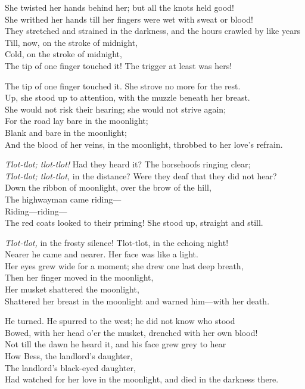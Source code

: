 \documentclass[oneside,12pt,english]{book}
\begin{document}
She twisted her hands behind her; but all the knots held good!\\
She writhed her hands till her fingers were wet with sweat or blood!\\
They stretched and strained in the darkness, and the hours crawled by like
years\\
Till, now, on the stroke of midnight,\\
Cold, on the stroke of midnight,\\
The tip of one finger touched it! The trigger at least was hers!


The tip of one finger touched it. She strove no more for the rest.\\
Up, she stood up to attention, with the muzzle beneath her breast.\\
She would not risk their hearing; she would not strive again;\\
For the road lay bare in the moonlight;\\
Blank and bare in the moonlight;\\
And the blood of her veins, in the moonlight, throbbed to her love’s refrain.


\textit{Tlot-tlot; tlot-tlot!} Had they heard it? The horsehoofs ringing
clear;\\
\textit{Tlot-tlot; tlot-tlot,} in the distance? Were they deaf that they did not
hear?\\
Down the ribbon of moonlight, over the brow of the hill,\\
The highwayman came riding---\\
Riding---riding---\\
The red coats looked to their priming! She stood up, straight and still.


\textit{Tlot-tlot,} in the frosty silence! {Tlot-tlot,} in the echoing night!\\
Nearer he came and nearer. Her face was like a light.\\
Her eyes grew wide for a moment; she drew one last deep breath,\\
Then her finger moved in the moonlight,\\
Her musket shattered the moonlight,\\
Shattered her breast in the moonlight and warned him---with her death.


He turned. He spurred to the west; he did not know who stood\\
Bowed, with her head o’er the musket, drenched with her own blood!\\
Not till the dawn he heard it, and his face grew grey to hear\\
How Bess, the landlord’s daughter,\\
The landlord’s black-eyed daughter,\\
Had watched for her love in the moonlight, and died in the darkness there.
\end{document}
